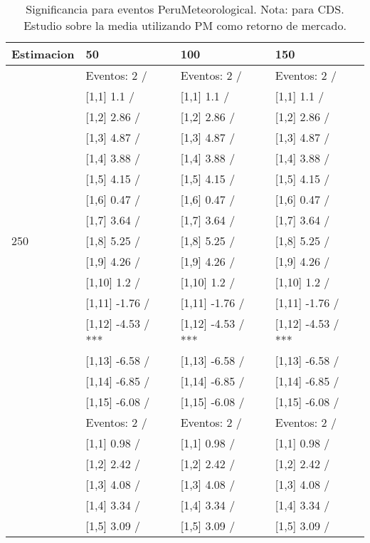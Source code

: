 \begin{table}

\caption{Significancia para eventos PeruMeteorological. Nota: para CDS. Estudio sobre la media utilizando PM como retorno de mercado.}
\centering
\begin{tabular}[t]{llll}
\toprule
Estimacion & 50 & 100 & 150\\
\midrule
 & Eventos:  2 / & Eventos:  2 / & Eventos:  2 /\\
 & {}[1,1] 1.1  / & {}[1,1] 1.1  / & {}[1,1] 1.1  /\\
 & {}[1,2] 2.86  / & {}[1,2] 2.86  / & {}[1,2] 2.86  /\\
 & {}[1,3] 4.87  / & {}[1,3] 4.87  / & {}[1,3] 4.87  /\\
 & {}[1,4] 3.88  / & {}[1,4] 3.88  / & {}[1,4] 3.88  /\\
\addlinespace
 & {}[1,5] 4.15  / & {}[1,5] 4.15  / & {}[1,5] 4.15  /\\
 & {}[1,6] 0.47  / & {}[1,6] 0.47  / & {}[1,6] 0.47  /\\
 & {}[1,7] 3.64  / & {}[1,7] 3.64  / & {}[1,7] 3.64  /\\
250 & {}[1,8] 5.25  / & {}[1,8] 5.25  / & {}[1,8] 5.25  /\\
 & {}[1,9] 4.26  / & {}[1,9] 4.26  / & {}[1,9] 4.26  /\\
\addlinespace
 & {}[1,10] 1.2  / & {}[1,10] 1.2  / & {}[1,10] 1.2  /\\
 & {}[1,11] -1.76  / & {}[1,11] -1.76  / & {}[1,11] -1.76  /\\
 & {}[1,12] -4.53  / *** & {}[1,12] -4.53  / *** & {}[1,12] -4.53  / ***\\
 & {}[1,13] -6.58  / & {}[1,13] -6.58  / & {}[1,13] -6.58  /\\
 & {}[1,14] -6.85  / & {}[1,14] -6.85  / & {}[1,14] -6.85  /\\
\addlinespace
 & {}[1,15] -6.08  / & {}[1,15] -6.08  / & {}[1,15] -6.08  /\\
 & Eventos:  2 / & Eventos:  2 / & Eventos:  2 /\\
 & {}[1,1] 0.98  / & {}[1,1] 0.98  / & {}[1,1] 0.98  /\\
 & {}[1,2] 2.42  / & {}[1,2] 2.42  / & {}[1,2] 2.42  /\\
 & {}[1,3] 4.08  / & {}[1,3] 4.08  / & {}[1,3] 4.08  /\\
\addlinespace
 & {}[1,4] 3.34  / & {}[1,4] 3.34  / & {}[1,4] 3.34  /\\
 & {}[1,5] 3.09  / & {}[1,5] 3.09  / & {}[1,5] 3.09  /\\

\end{tabular}
\end{table}
